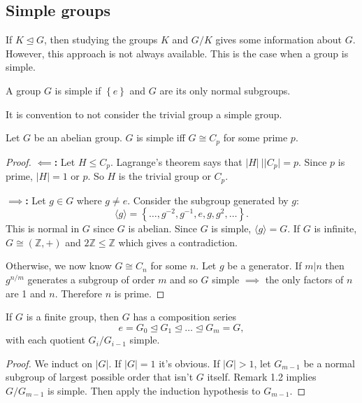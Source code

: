 \documentclass[a4paper]{scrartcl}
\begin{document}
\subsection{Simple groups}
If $K \unlhd G$, then studying the groups $K$ and $G/K$ gives some information about $G$. However, this approach is not always available. This is the case when a group is simple. 
\begin{definition*}
      A group $G$ is simple if $\left\{e\right\}$ and $G$ are its only normal subgroups.
\end{definition*}
\begin{remark}
     It is convention to not consider the trivial group a simple group.
\end{remark}
\begin{lemma}\label{abeliansimpleiffCp}
     Let $G$ be an abelian group. $G$ is simple iff $G \cong C_{p}$ for some prime $p$. 
\end{lemma}
\begin{proof}
      \textbf{$\impliedby$:}
      Let $H \leq C_{p}$. Lagrange's theorem says that $|H| \ | |C_{p}|=p$. Since $p$ is prime, $|H|=1$ or $p$. So $H$ is the trivial group or $C_{p}$.  

      \textbf{$\implies $:}
      Let $g \in G$ where $g \neq e$. Consider the subgroup generated by $g$: \[
      \langle g \rangle = \left\{\ldots , g^{-2},g^{-1},e, g, g^2, \ldots \right\}
      .\]  This is normal in $G$ since $G$ is abelian. Since $G$ is simple, $\langle g \rangle =G$. If $G$ is infinite, $G \cong (\mathbb{Z}, +)$ and $2\mathbb{Z} \leq \mathbb{Z}$ which gives a contradiction. 

      Otherwise, we now know $G \cong C_{n}$ for some $n$. Let $g$ be a generator. If $m |n $ then $g^{n/m}$ generates a subgroup of order $m$ and so $G$ simple $\implies $ the only factors of $n$ are 1 and $n$. Therefore $n$ is prime.  
\end{proof}
\begin{lemma}\label{compositionserieslemma}
     If $G$ is a finite group, then $G$ has a composition series \[
     e =G_{0} \unlhd G_1 \unlhd \ldots \unlhd G_{m}=G
     ,\] with each quotient $G_{i}/G_{i-1}$ simple.
\end{lemma}
\begin{proof}
      We induct on $|G|$. If $|G|=1$ it's obvious. If $|G|>1$, let $G_{m-1}$ be a normal subgroup of largest possible order that isn't $G$ itself. Remark 1.2 implies $G/G_{m-1}$ is simple. Then apply the induction hypothesis to $G_{m-1}$. 
\end{proof}
\end{document}
